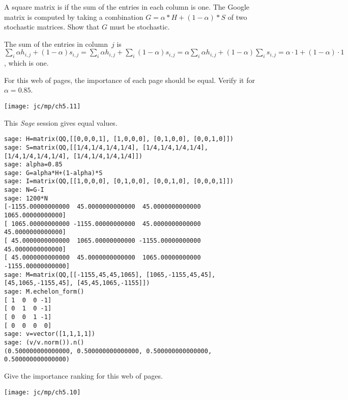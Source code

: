 \begin{exercises}
  \item A square matrix is 
    if the sum of the entries in each column is one.
    The Google matrix is computed by taking a combination
    $G=\alpha*H+(1-\alpha)*S$ of two stochastic matrices.
    Show that $G$ must be stochastic.
    \begin{answer}
      The sum of the entries in column~$j$ is 
      $\sum_i \alpha h_{i,j}+(1-\alpha)s_{i,j}
       =\sum_i \alpha h_{i,j}+\sum_i (1-\alpha)s_{i,j}
       =\alpha\sum_i \alpha h_{i,j} +(1-\alpha)\sum_i s_{i,j}
       =\alpha\cdot 1+(1-\alpha)\cdot 1$,
      which is one.
    \end{answer}
  \item For this web of pages, the importance of each page should be equal.
    Verify it for $\alpha=0.85$.
    \begin{center}
      \texttt{[image: jc/mp/ch5.11]}
    \end{center}
    \begin{answer}
      This \textit{Sage} session gives equal values.
\begin{lstlisting}
sage: H=matrix(QQ,[[0,0,0,1], [1,0,0,0], [0,1,0,0], [0,0,1,0]])
sage: S=matrix(QQ,[[1/4,1/4,1/4,1/4], [1/4,1/4,1/4,1/4], [1/4,1/4,1/4,1/4], [1/4,1/4,1/4,1/4]])
sage: alpha=0.85     
sage: G=alpha*H+(1-alpha)*S    
sage: I=matrix(QQ,[[1,0,0,0], [0,1,0,0], [0,0,1,0], [0,0,0,1]])
sage: N=G-I
sage: 1200*N         
[-1155.00000000000  45.0000000000000  45.0000000000000  1065.00000000000]
[ 1065.00000000000 -1155.00000000000  45.0000000000000  45.0000000000000]
[ 45.0000000000000  1065.00000000000 -1155.00000000000  45.0000000000000]
[ 45.0000000000000  45.0000000000000  1065.00000000000 -1155.00000000000]
sage: M=matrix(QQ,[[-1155,45,45,1065], [1065,-1155,45,45], [45,1065,-1155,45], [45,45,1065,-1155]]) 
sage: M.echelon_form()       
[ 1  0  0 -1]
[ 0  1  0 -1]
[ 0  0  1 -1]
[ 0  0  0  0]
sage: v=vector([1,1,1,1])
sage: (v/v.norm()).n()
(0.500000000000000, 0.500000000000000, 0.500000000000000, 0.500000000000000)
\end{lstlisting}
    \end{answer}
  \item \cite{BryanLeise}
    Give the importance ranking for this web of pages.
    \begin{center}
      \texttt{[image: jc/mp/ch5.10]}
    \end{center}
    \begin{exparts}

\end{exparts}
\end{exercises}
